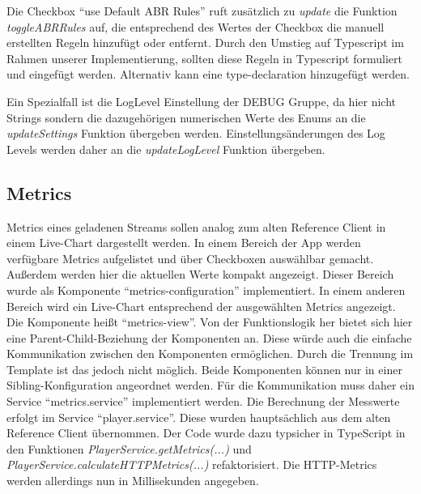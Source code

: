 \documentclass[conference]{IEEEtran}
\begin{document}
Die Checkbox “use Default ABR Rules” ruft zusätzlich zu \textit{update} die Funktion \textit{toggleABRRules} auf, die entsprechend des Wertes der Checkbox die manuell erstellten Regeln hinzufügt oder entfernt. Durch den Umstieg auf Typescript im Rahmen unserer Implementierung, sollten diese Regeln in Typescript formuliert und eingefügt werden. Alternativ kann eine type-declaration hinzugefügt werden. 


Ein Spezialfall ist die LogLevel Einstellung der DEBUG Gruppe, da hier nicht Strings sondern die dazugehörigen numerischen Werte des Enums an die \textit{updateSettings} Funktion übergeben werden. Einstellungsänderungen des Log Levels werden daher an die \textit{updateLogLevel} Funktion übergeben.

\subsection{Metrics}
\label{Metrics}
Metrics eines geladenen Streams sollen analog zum alten Reference Client in einem Live-Chart dargestellt werden. In einem Bereich der App werden verfügbare Metrics aufgelistet und über Checkboxen auswählbar gemacht. Außerdem werden hier die aktuellen Werte kompakt angezeigt. Dieser Bereich wurde als Komponente ``metrics-configuration'' implementiert. In einem anderen Bereich wird ein Live-Chart entsprechend der ausgewählten Metrics angezeigt. Die Komponente heißt ``metrics-view''. Von der Funktionslogik her bietet sich hier eine Parent-Child-Beziehung der Komponenten an. Diese würde auch die einfache Kommunikation zwischen den Komponenten ermöglichen. Durch die Trennung im Template ist das jedoch nicht möglich. Beide Komponenten können nur in einer Sibling-Konfiguration angeordnet werden. Für die Kommunikation muss daher ein Service ``metrics.service'' implementiert werden. Die Berechnung der Messwerte erfolgt im Service ``player.service''. Diese wurden hauptsächlich aus dem alten Reference Client übernommen. Der Code wurde dazu typsicher in TypeScript in den Funktionen \emph{PlayerService.getMetrics(...)} und \emph{PlayerService.calculateHTTPMetrics(...)} refaktorisiert. Die HTTP-Metrics werden allerdings nun in Millisekunden angegeben.
\end{document}
